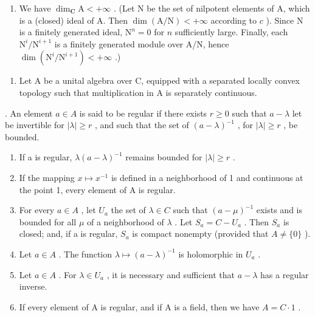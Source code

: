 \begin{enumerate}
\def\labelenumi{\alph{enumi})}
\setcounter{enumi}{3}
\tightlist
\item
  We have \(\dim_{\mathbf{C}}\mathrm{A} < +\infty\) . (Let N be the set of nilpotent elements of A, which is a (closed) ideal of A. Then \(\dim (\mathrm{A / N}) < +\infty\) according to \(c\) ). Since N is a finitely generated ideal, \(\mathrm{N}^n = 0\) for \(n\) sufficiently large. Finally, each \(\mathrm{N}^i /\mathrm{N}^{i + 1}\) is a finitely generated module over A/N, hence \(\dim (\mathrm{N}^i /\mathrm{N}^{i + 1}) < +\infty\) .)
\end{enumerate}

\begin{enumerate}
\def\labelenumi{\arabic{enumi})}
\setcounter{enumi}{33}
\tightlist
\item
  Let A be a unital algebra over C, equipped with a separated locally convex topology such that multiplication in A is separately continuous.
\end{enumerate}

. An element \(a \in A\) is said to be regular if there exists \(r \geqslant 0\) such that \(a - \lambda\) let be invertible for \(|\lambda| \geqslant r\) , and such that the set of \((a - \lambda)^{-1}\) , for \(|\lambda| \geqslant r\) , be bounded.

\begin{enumerate}
\def\labelenumi{\alph{enumi})}
\item
  If a is regular, \(\lambda(a-\lambda)^{-1}\) remains bounded for \(|\lambda|\geqslant r\) .
\item
  If the mapping \(x \mapsto x^{-1}\) is defined in a neighborhood of 1 and continuous at the point 1, every element of A is regular.
\item
  For every \(a \in A\) , let \(U_{a}\) the set of \(\lambda \in C\) such that \((a - \mu)^{-1}\) exists and is bounded for all \(\mu\) of a neighborhood of \(\lambda\) . Let \(S_{a} = C - U_{a}\) . Then \(S_{a}\) is closed; and, if a is regular, \(S_{a}\) is compact nonempty (provided that \(A \neq \{0\}\) ).
\item
  Let \(a \in A\) . The function \(\lambda \mapsto (a - \lambda)^{-1}\) is holomorphic in \(U_{a}\) .
\item
  Let \(a \in A\) . For \(\lambda \in U_{a}\) , it is necessary and sufficient that \(a - \lambda\) has a regular inverse.
\item
  If every element of A is regular, and if A is a field, then we have \(A = C \cdot 1\) .
\end{enumerate}


